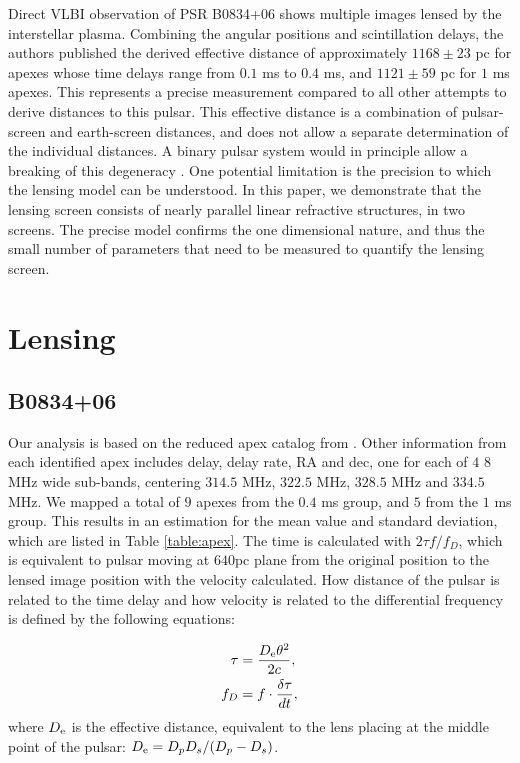 \documentclass[useAMS,usenatbib]{mn2e}
\begin{document}
Direct VLBI observation of PSR B0834+06 shows multiple images lensed
by the interstellar plasma.  Combining the angular positions and
scintillation delays, the authors published the derived effective
distance \citep{2010ApJ...708..232B} of approximately $1168\pm 23$ pc
for apexes whose time delays range from $0.1$ ms to $0.4$ ms, and
$1121\pm 59$ pc for $1$ ms apexes.  This represents a precise
measurement compared to all other attempts to derive distances to this
pulsar.  This effective distance is a combination of pulsar-screen and
earth-screen distances, and does not allow a separate determination of
the individual distances.  A binary pulsar system would in principle
allow a breaking of this degeneracy \citep{2014MNRAS.442.3338P}. One
potential limitation is the precision to which the lensing model can
be understood.  In this paper, we demonstrate that the lensing screen
consists of nearly parallel linear refractive structures, in two
screens.  The precise model confirms the one dimensional nature, and
thus the small number of parameters that need to be measured to
quantify the lensing screen. 

\section{Lensing}
\subsection{B0834+06}

Our analysis is based on the reduced apex catalog from
\citet{2010ApJ...708..232B}. Other information from each identified apex includes delay,
delay rate, RA and dec, one for each of $4$ $8$ MHz wide sub-bands, centering $314.5$ MHz, $322.5$ MHz, $328.5$ MHz and $334.5$ MHz.  We mapped
a total of $9$ apexes from the $0.4$ ms group, and $5$ from the $1$ ms
group. This results in an estimation
for the mean value and standard deviation, which are listed in Table
\ref{table:apex}. The time is calculated with $2{\tau}f/{f_{D}}$,
which is equivalent to pulsar moving at $640$pc plane from the
original position to the lensed image position with the velocity
calculated. How distance of the pulsar is related to the time delay and how velocity is related to the differential frequency is defined by the following equations:

\begin{align*}
\tau &=\frac{D_{\rm e}{\theta}^2}{2c}, \\
f_D  &=f\cdot\frac{\delta\tau}{dt},
\end{align*} 
where ${D_{\rm e}}$ is the effective distance, equivalent to the lens placing at the middle point of the pulsar: $D_{\rm e}={D_p D_s}/({D_p - D_s})$. 
\end{document}
